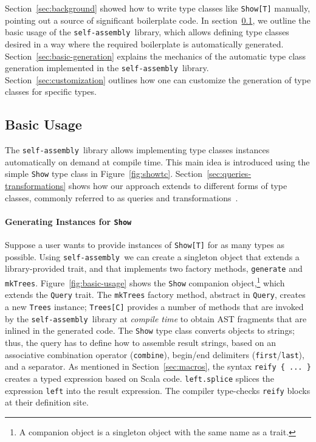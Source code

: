 \documentclass[preprint,nocopyrightspace]{sigplanconf}
\newcommand{\selfassembly}{\texttt{self-assembly~}}
\begin{document}
Section~\ref{sec:background} showed how to write type classes like \verb|Show[T]|
manually, pointing out a source of significant boilerplate code. In
section~\ref{sec:basic-usage}, we outline the basic usage of the
\selfassembly library, which allows defining type classes desired in a way
where the required boilerplate is automatically generated.
Section~\ref{sec:basic-generation} explains the mechanics of the automatic
type class generation implemented in the \selfassembly library.
Section~\ref{sec:customization} outlines how one can customize the generation
of type classes for specific types.

\subsection{Basic Usage}
\label{sec:basic-usage}

The \selfassembly library allows implementing type classes instances automatically on
demand at compile time. This main idea is introduced using the simple \verb|Show| type class
in Figure~\ref{fig:showtc}. Section~\ref{sec:queries-transformations}
shows how our approach extends to different forms of type classes, commonly referred to
as queries and transformations~\cite{SYB}.

\paragraph{Generating Instances for \texttt{Show}} Suppose a user wants
to provide instances of \verb|Show[T]| for as many
types as possible. Using \selfassembly we can create a singleton
object that extends a library-provided trait, and that implements two factory
methods, \verb|generate| and \verb|mkTrees|.
Figure~\ref{fig:basic-usage} shows the \verb|Show| companion object,\footnote{A companion
object is a singleton object with the same name as a trait.} which extends
the \verb|Query| trait. The \verb|mkTrees| factory method, abstract in \verb|Query|,
creates a new \verb|Trees| instance; \verb|Trees[C]| provides a number of methods that
are invoked by the \selfassembly library at \emph{compile time} to obtain AST fragments that are
inlined in the generated code. The \verb|Show| type class converts objects to
strings; thus, the query has to define how to assemble result strings, based
on an associative combination operator (\verb|combine|), begin/end delimiters
(\verb|first|/\verb|last|), and a separator.
As mentioned in Section~\ref{sec:macros}, the syntax \verb|reify { ... }|
creates a typed expression based on Scala code. \verb|left.splice| splices the
expression \verb|left| into the result expression. The compiler type-checks
\verb|reify| blocks at their definition site.
\end{document}
